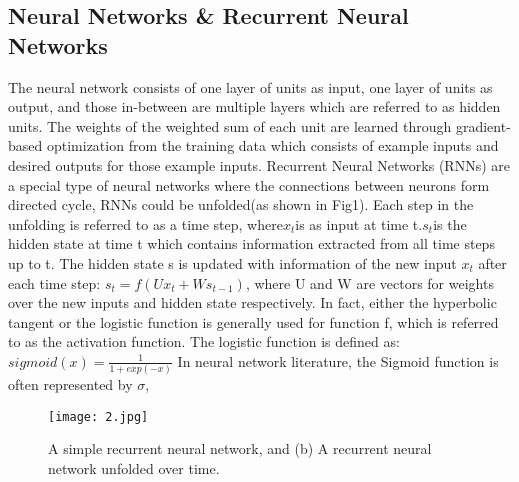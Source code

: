 \documentclass{article}
\begin{document}
\subsection{Neural Networks \& Recurrent Neural Networks}
The neural network consists of one layer of units as input,
one layer of units as output, and those in-between are
multiple layers which are referred to as hidden units. The
weights of the weighted sum of each unit are learned through
gradient-based optimization from the training data which
consists of example inputs and desired outputs for those
example inputs. Recurrent Neural Networks (RNNs) are a
special type of neural networks where the connections
between neurons form directed cycle, RNNs could be
unfolded(as shown in Fig1). Each step in the unfolding is
referred to as a time step, where$x_{t}$is as input at time t.$s_{t}$is
the hidden state at time t which contains information
extracted from all time steps up to t. The hidden state s is
updated with information of the new input $x_{t}$ after  each  time  step:
$s_{t}=f(Ux_{t}+Ws_{t-1})$, where U and W are vectors for weights over the new inputs and hidden state respectively. In fact, either the hyperbolic tangent or the logistic function is generally used for function f, which is referred to as the activation function. The logistic function is defined  as: 
$sigmoid(x)=\frac{1}{1+exp(-x)}$ In neural network
literature, the Sigmoid function is often represented by $\sigma$,
\begin{figure}[h]
    \centering
    \texttt{[image: 2.jpg]}
    \caption{A simple recurrent neural network, and (b) A
recurrent neural network unfolded over time.}
    \label{fig:my_label}
\end{figure}
\end{document}
